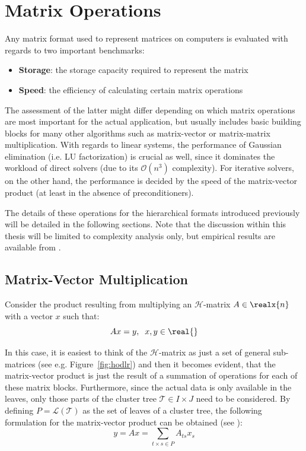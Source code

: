 \section{Matrix Operations}
\label{sec:matrix_operations}

Any matrix format used to represent matrices on computers is evaluated with regards to two important benchmarks:
\begin{itemize}
    \item \textbf{Storage}: the storage capacity required to represent the matrix
    \item \textbf{Speed}: the efficiency of calculating certain matrix operations
\end{itemize}

The assessment of the latter might differ depending on which matrix operations are most important for the actual application, but usually includes basic building blocks for many other algorithms such as matrix-vector or matrix-matrix multiplication. With regards to linear systems, the performance of Gaussian elimination (i.e. LU factorization) is crucial as well, since it dominates the workload of direct solvers (due to its $\mathcal{O}(n^3)$ complexity). For iterative solvers, on the other hand, the performance is decided by the speed of the matrix-vector product (at least in the absence of preconditioners).

The details of these operations for the hierarchical formats introduced previously will be detailed in the following sections. Note that the discussion within this thesis will be limited to complexity analysis only, but empirical results are available from \cite{spalthoff_pg_hierarchical_2020}.


\subsection{Matrix-Vector Multiplication}
\label{sec:matrix_vector}

Consider the product resulting from multiplying an  $\mathcal{H}$-matrix $A \in \realx{n}$ with a vector $x$ such that:
\begin{equation}
    Ax = y, \; \; x,y \in \real{}
\end{equation}

\noindent In this case, it is easiest to think of the $\mathcal{H}$-matrix as just a set of general sub-matrices (see e.g. Figure~\hyperref[fig:hodlr]{\ref{fig:hodlr}}) and then it becomes evident, that the matrix-vector product is just the result of a summation of operations for each of these matrix blocks. Furthermore, since the actual data is only available in the leaves, only those parts of the cluster tree $\mathcal{T} \in I \times J$ need to be considered. By defining $P = \mathcal{L}(\mathcal{T})$ as the set of leaves of a cluster tree, the following formulation for the matrix-vector product can be obtained (see  \cite{bebendorf_hierarchical_2008}):
\begin{equation}
    y=Ax = \sum_{t \times s \in P}{A_{ts}x_s}
\end{equation}

